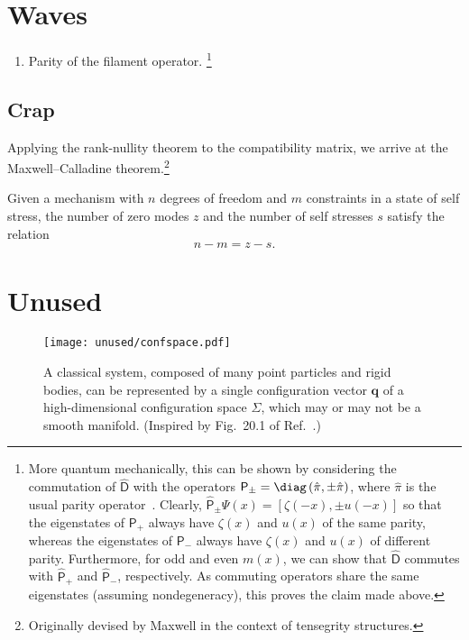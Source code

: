 \section{Waves}

\begin{enumerate}
  \item Parity of the filament operator.%
    \footnote{%
    More quantum mechanically, this can be shown by considering the commutation of $\widehat{\mathsf{D}}$ with the operators $\mathsf{P}_{\pm} = \diag\left(\hat{\pi}, \pm\hat{\pi}\right)$, where $\hat{\pi}$ is the usual parity operator~\cite{cohen-tannoudji2019}.
      Clearly, $\widehat{\mathsf{P}}_{\pm}\Psi(x) = \left[\zeta(-x), \pm u(-x)\right]$ so that
      the eigenstates of $\mathsf{P}_{+}$ always have $\zeta(x)$ and $u(x)$ of the same parity, whereas the eigenstates of $\mathsf{P}_{-}$ always have $\zeta(x)$ and $u(x)$ of different parity.
      Furthermore, for odd and even $m(x)$, we can show that $\widehat{\mathsf{D}}$ commutes with $\widehat{\mathsf{P}}_{+}$ and $\widehat{\mathsf{P}}_{-}$, respectively.
      As commuting operators share the same eigenstates (assuming nondegeneracy), this proves the claim made above.%
    }
\end{enumerate}

\subsection{Crap}

Applying the rank-nullity theorem to the compatibility matrix, we arrive at the Maxwell--Calladine theorem.\footnote{Originally devised by Maxwell in the context of tensegrity structures.}
%
\begin{theorem}
  Given a mechanism with $n$ degrees of freedom and $m$ constraints in a state of self stress, the number of zero modes $z$ and the number of self stresses $s$ satisfy the relation
  \begin{equation*}
    n - m = z - s.
  \end{equation*}
\end{theorem}

\section{Unused}

\begin{figure}
  \begin{center}
    \texttt{[image: unused/confspace.pdf]}
  \end{center}
  \caption{A classical system, composed of many point particles and rigid bodies, can be represented by a single configuration vector $\bm{q}$ of a high-dimensional configuration space $\Sigma$, which may or may not be a smooth manifold. (Inspired by Fig.~20.1 of Ref.~\cite{penrose2004}.)}
\end{figure}

